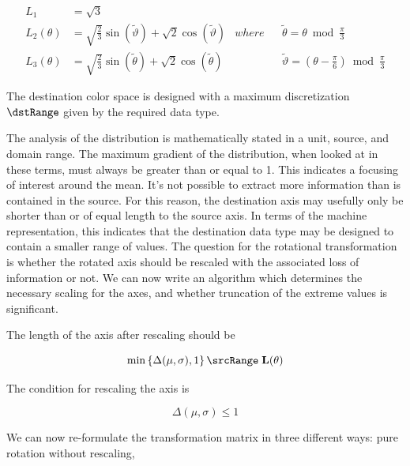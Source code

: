 \begin{align}\label{eq:L}
L_1 &= \sqrt{3} \\
L_2(\theta)  &= \sqrt{\frac{2}{3}} \sin \left(\widetilde{\vartheta}\right) + \sqrt{2} \cos \left(\widetilde{\vartheta}\right)  & where & & \widetilde{\theta} = \theta  \bmod \frac{\pi }{3} \\
L_3(\theta)  &= \sqrt{\frac{2}{3}} \sin \left(\widetilde{\theta}\right) + \sqrt{2} \cos \left(\widetilde{\theta}\right) & & & \widetilde{\vartheta} = \left(\theta - \frac{\pi }{6}\right) \bmod \frac{\pi }{3}
\end{align}

The destination color space is designed with a maximum discretization $\dstRange$ given by the required data type.

The analysis of the distribution is mathematically stated in a unit, source, and domain range. The maximum gradient of the distribution, when looked at in these terms, must always be greater than or equal to 1. This indicates a focusing of interest around the mean. It's not possible to extract more information than is contained in the source. For this reason, the destination axis may usefully only be shorter than or of equal length to the source axis. In terms of the machine representation, this indicates that the destination data type may be designed to contain a smaller range of values. The question for the rotational transformation is whether the rotated axis should be rescaled with the associated loss of information or not. We can now write an algorithm which determines the necessary scaling for the axes, and whether truncation of the extreme values is significant.

The length of the axis after rescaling should be

\begin{equation}\label{eq:RescaleAxis}
\min\left\{ \Delta(\mu,\sigma) , 1\right\} \srcRange \; \mathbf{L}(\theta)
\end{equation}

The condition for rescaling the axis is

\begin{equation}\label{eq:RescaleAxisCondition}
\Delta(\mu,\sigma) \le 1
\end{equation}

We can now re-formulate the transformation matrix in three different ways: pure rotation without rescaling, 

